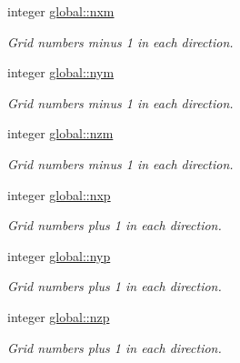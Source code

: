 \textbf{ }\par
\begin{DoxyCompactItemize}
\item 
integer \mbox{\hyperlink{namespaceglobal_aa37f5fe09139707ac1723302127436b1}{global\+::nxm}}
\begin{DoxyCompactList}\small\item\em Grid numbers minus 1 in each direction. \end{DoxyCompactList}\item 
integer \mbox{\hyperlink{namespaceglobal_a9852876e90514ccc182c0ed0b27cdaad}{global\+::nym}}
\begin{DoxyCompactList}\small\item\em Grid numbers minus 1 in each direction. \end{DoxyCompactList}\item 
integer \mbox{\hyperlink{namespaceglobal_a76e27e2001870f6606e51d33a2c70f60}{global\+::nzm}}
\begin{DoxyCompactList}\small\item\em Grid numbers minus 1 in each direction. \end{DoxyCompactList}\end{DoxyCompactItemize}

\textbf{ }\par
\begin{DoxyCompactItemize}
\item 
integer \mbox{\hyperlink{namespaceglobal_a227001d8177d0295b61a39948436adaa}{global\+::nxp}}
\begin{DoxyCompactList}\small\item\em Grid numbers plus 1 in each direction. \end{DoxyCompactList}\item 
integer \mbox{\hyperlink{namespaceglobal_a868bbe46b97daa7ff6c962fff16bbf2f}{global\+::nyp}}
\begin{DoxyCompactList}\small\item\em Grid numbers plus 1 in each direction. \end{DoxyCompactList}\item 
integer \mbox{\hyperlink{namespaceglobal_ab376cd7d790b630ad83ffcded3c56366}{global\+::nzp}}
\begin{DoxyCompactList}\small\item\em Grid numbers plus 1 in each direction. \end{DoxyCompactList}\end{DoxyCompactItemize}

